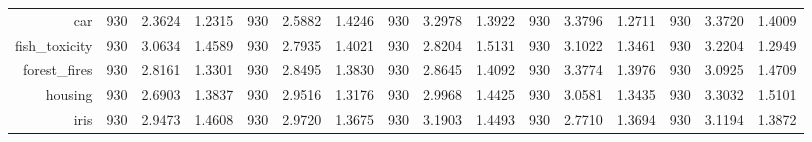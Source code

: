 \begin{table}[htbp]
{\begin{tabular}{rccccccccccccccc}
                  car                                 & 930                                   & \cellcolor[rgb]{ .776,  .937,  .808}\textcolor[rgb]{ 0,  .38,  0}{2.3624}          & 1.2315          & 930            & 2.5882                                                                    & 1.4246          & 930            & 3.2978                                                                    & 1.3922          & 930            & 3.3796                                                                    & 1.2711          & 930            & 3.3720          & 1.4009          \\
                  fish\_toxicity                      & 930                                   & 3.0634                                                                             & 1.4589          & 930            & \cellcolor[rgb]{ .776,  .937,  .808}\textcolor[rgb]{ 0,  .38,  0}{2.7935} & 1.4021          & 930            & 2.8204                                                                    & 1.5131          & 930            & 3.1022                                                                    & 1.3461          & 930            & 3.2204          & 1.2949          \\
                  forest\_fires                       & 930                                   & \cellcolor[rgb]{ .776,  .937,  .808}\textcolor[rgb]{ 0,  .38,  0}{2.8161}          & 1.3301          & 930            & 2.8495                                                                    & 1.3830          & 930            & 2.8645                                                                    & 1.4092          & 930            & 3.3774                                                                    & 1.3976          & 930            & 3.0925          & 1.4709          \\
                  housing                             & 930                                   & \cellcolor[rgb]{ .776,  .937,  .808}\textcolor[rgb]{ 0,  .38,  0}{2.6903}          & 1.3837          & 930            & 2.9516                                                                    & 1.3176          & 930            & 2.9968                                                                    & 1.4425          & 930            & 3.0581                                                                    & 1.3435          & 930            & 3.3032          & 1.5101          \\
                  iris                                & 930                                   & 2.9473                                                                             & 1.4608          & 930            & 2.9720                                                                    & 1.3675          & 930            & 3.1903                                                                    & 1.4493          & 930            & \cellcolor[rgb]{ .776,  .937,  .808}\textcolor[rgb]{ 0,  .38,  0}{2.7710} & 1.3694          & 930            & 3.1194          & 1.3872          \\

\end{tabular}}
\end{table}
